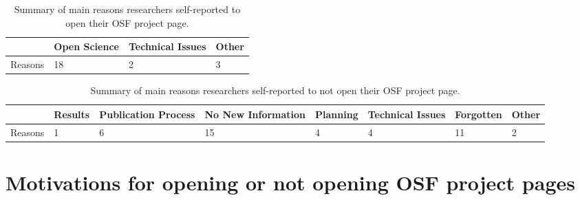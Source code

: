 \documentclass[
  ,jou, a4paper,floatsintext]{apa6}
\begin{document}
\begin{table*}[tbp]

\begin{center}
\begin{threeparttable}

\caption{\label{tab:reasonopen}Summary of main reasons researchers self-reported to open their OSF project page.}

\begin{tabular}{llll}
\toprule
 & \multicolumn{1}{c}{Open Science} & \multicolumn{1}{c}{Technical Issues} & \multicolumn{1}{c}{Other}\\
\midrule
Reasons & 18 & 2 & 3\\
\bottomrule
\end{tabular}

\end{threeparttable}
\end{center}

\end{table*}

\begin{table*}[tbp]

\begin{center}
\begin{threeparttable}

\caption{\label{tab:reasonclosed}Summary of main reasons researchers self-reported to not open their OSF project page.}

\begin{tabular}{llllllll}
\toprule
 & \multicolumn{1}{c}{Results} & \multicolumn{1}{c}{Publication Process} & \multicolumn{1}{c}{No New Information} & \multicolumn{1}{c}{Planning} & \multicolumn{1}{c}{Technical Issues} & \multicolumn{1}{c}{Forgotten} & \multicolumn{1}{c}{Other}\\
\midrule
Reasons & 1 & 6 & 15 & 4 & 4 & 11 & 2\\
\bottomrule
\end{tabular}

\end{threeparttable}
\end{center}

\end{table*}

\hypertarget{motivations-for-opening-or-not-opening-osf-project-pages}{%
\section{Motivations for opening or not opening OSF project pages}\label{motivations-for-opening-or-not-opening-osf-project-pages}}
\end{document}
